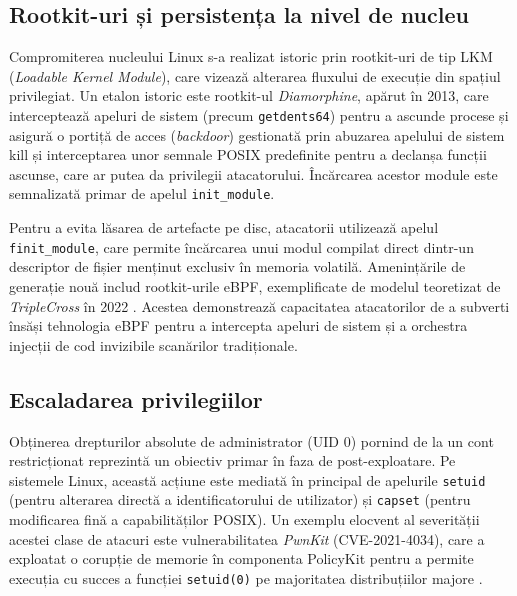 \subsection{Rootkit-uri și persistența la nivel de nucleu}
\label{subsec:rootkits}

\par Compromiterea nucleului Linux s-a realizat istoric prin rootkit-uri de tip LKM (\textit{Loadable Kernel Module}), care vizează alterarea fluxului de execuție din spațiul privilegiat. Un etalon istoric este rootkit-ul \textit{Diamorphine}, apărut în 2013, care interceptează apeluri de sistem (precum \texttt{getdents64}) pentru a ascunde procese și asigură o portiță de acces (\textit{backdoor}) gestionată prin abuzarea apelului de sistem kill și interceptarea unor semnale POSIX predefinite pentru a declanșa funcții ascunse, care ar putea da privilegii atacatorului. Încărcarea acestor module este semnalizată primar de apelul \texttt{init\_module}.

\par Pentru a evita lăsarea de artefacte pe disc, atacatorii utilizează apelul \texttt{finit\_module}, care permite încărcarea unui modul compilat direct dintr-un descriptor de fișier menținut exclusiv în memoria volatilă. Amenințările de generație nouă includ rootkit-urile eBPF, exemplificate de modelul teoretizat de \textit{TripleCross} în 2022 \cite{TripleCross2022}. Acestea demonstrează capacitatea atacatorilor de a subverti însăși tehnologia eBPF pentru a intercepta apeluri de sistem și a orchestra injecții de cod invizibile scanărilor tradiționale.

\subsection{Escaladarea privilegiilor}
\label{subsec:privesc}

\par Obținerea drepturilor absolute de administrator (UID 0) pornind de la un cont restricționat reprezintă un obiectiv primar în faza de post-exploatare. Pe sistemele Linux, această acțiune este mediată în principal de apelurile \texttt{setuid} (pentru alterarea directă a identificatorului de utilizator) și \texttt{capset} (pentru modificarea fină a capabilităților POSIX). Un exemplu elocvent al severității acestei clase de atacuri este vulnerabilitatea \textit{PwnKit} (CVE-2021-4034), care a exploatat o corupție de memorie în componenta PolicyKit pentru a permite execuția cu succes a funcției \texttt{setuid(0)} pe majoritatea distribuțiilor majore \cite{PwnKit2022}.

